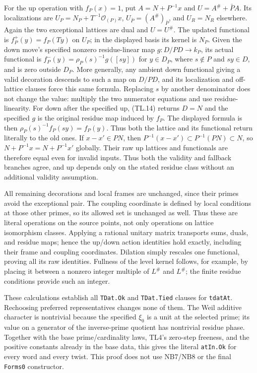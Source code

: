 For the up operation with $f_P(x)=1$, put
$A=N+P^{-1}x$ and $U=A^\#+\bar P A$. Its localizations are
$U_P=N_P+T^{-1}\mathcal O_{(P)}x$,
$U_{\bar P}=(A^\#)_{\bar P}$, and $U_R=N_R$ elsewhere.
Again the two exceptional lattices are dual and $U=U^\#$.
The updated functional is $f_P^+(y)=f_P(Ty)$ on $U_P$; in the
displayed basis its kernel is $N_P$. Given the down move's specified
nonzero residue-linear map $g:D/PD\to k_P$, its actual functional is
$f_P^-(y)=\rho_P(s)^{-1}g([sy])$ for $y\in D_P$, where
$s\notin P$ and $sy\in D$, and is zero outside $D_P$.
More generally, any ambient down functional giving a valid decoration
descends to such a map on $D/PD$, and its localization and off-lattice
clauses force this same formula.
Replacing $s$ by another denominator does not change the value:
multiply the two numerator equations and use residue-linearity.
For down after the specified up, (TL.14) returns $D=N$ and the
specified $g$ is the original residue map induced by $f_P$.
The displayed formula is then $\rho_P(s)^{-1}f_P(sy)=f_P(y)$.
Thus both the lattice and its functional return literally to the
old ones. If $x-x'\in PN$, then
$P^{-1}(x-x')\subset P^{-1}(PN)\subset N$, so
$N+P^{-1}x=N+P^{-1}x'$ globally. Their raw up lattices and
functionals are therefore equal even for invalid inputs. Thus both
the validity and fallback branches agree, and up depends only on
the stated residue class without an additional validity assumption.

All remaining decorations and local frames are unchanged, since
their primes avoid the exceptional pair. The coupling coordinate is
defined by local conditions at those other primes, so its allowed
set is unchanged as well. Thus these are literal operations on the
source points, not only operations on lattice isomorphism classes.
Applying a rational unitary matrix transports sums, duals, and
residue maps; hence the up/down action identities hold exactly,
including their frame and coupling coordinates. Dilation simply
rescales one functional, proving all its raw identities. Fullness
of the level kernel follows, for example, by placing it between a
nonzero integer multiple of $L^\#$ and $L^\#$; the finite residue
conditions provide such an integer.

These calculations establish all \texttt{TDat.Ok} and
\texttt{TDat.Tied} clauses for \texttt{tdatAt}. Rechoosing preferred
representatives changes none of them. The Weil additive character
is nontrivial because the specified $\xi_0$ is a unit at the selected
prime; its value on a generator of the inverse-prime quotient has
nontrivial residue phase. Together with the base prime/cardinality
laws, TL4's zero-step freeness, and the positive constants already
in the base data, this gives the literal \texttt{atIn.Ok} for every
word and every twist. This proof does not use NB7/NB8 or the final
\texttt{Forms0} constructor.


